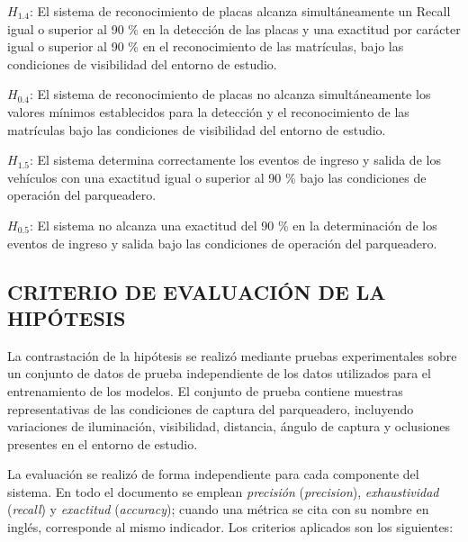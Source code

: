 $H_{1{.}4}$: El sistema de reconocimiento de placas alcanza simultáneamente un
Recall igual o superior al 90 \% en la detección de las placas y una exactitud
por carácter igual o superior al 90 \% en el reconocimiento de las matrículas,
bajo las condiciones de visibilidad del entorno de estudio.

$H_{0{.}4}$: El sistema de reconocimiento de placas no alcanza simultáneamente los
valores mínimos establecidos para la detección y el reconocimiento de las
matrículas bajo las condiciones de visibilidad del entorno de estudio.

$H_{1{.}5}$: El sistema determina correctamente los eventos de ingreso y salida de
los vehículos con una exactitud igual o superior al 90 \% bajo las condiciones
de operación del parqueadero.

$H_{0{.}5}$: El sistema no alcanza una exactitud del 90 \% en la determinación de
los eventos de ingreso y salida bajo las condiciones de operación del parqueadero.

\subsection*{CRITERIO DE EVALUACIÓN DE LA HIPÓTESIS}


La contrastación de la hipótesis se realizó mediante pruebas experimentales
sobre un conjunto de datos de prueba independiente de los datos utilizados para
el entrenamiento de los modelos. El conjunto de prueba contiene muestras
representativas de las condiciones de captura del parqueadero, incluyendo
variaciones de iluminación, visibilidad, distancia, ángulo de captura y
oclusiones presentes en el entorno de estudio.

La evaluación se realizó de forma independiente para cada componente del
sistema. En todo el documento se emplean \emph{precisión} (\textit{precision}),
\emph{exhaustividad} (\textit{recall}) y \emph{exactitud} (\textit{accuracy});
cuando una métrica se cita con su nombre en inglés, corresponde al mismo
indicador. Los criterios aplicados son los siguientes:

